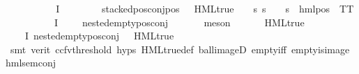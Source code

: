 \begin{isabellebody}
\ \ \isamarkupfalse%
\ {}\ \isamarkupfalse%
\ {\isasymphi}\ \ {\isachardoublequoteopen}{\isasymphi}{\isasymin}{\isasymPhi}\ {\isacharbackquote}{\kern0pt}\ I{\isachardoublequoteclose}\isanewline
\ \ \ \ \ \ \ \ {\isachardoublequoteopen}stacked{\isacharunderscore}{\kern0pt}pos{\isacharunderscore}{\kern0pt}conj{\isacharunderscore}{\kern0pt}pos\ {\isasymphi}{\isachardoublequoteclose}\ {\isachardoublequoteopen}{\isacharparenleft}{\kern0pt}{\isasymnot}\ HML{\isacharunderscore}{\kern0pt}true\ {\isasymphi}\ {\isasymlongrightarrow}\ {\isacharparenleft}{\kern0pt}{\isasymexists}{\isasymalpha}{\isachardot}{\kern0pt}\ {\isasymforall}s{\isachardot}{\kern0pt}\ {\isacharparenleft}{\kern0pt}s\ {\isasymTurnstile}\ {\isasymphi}{\isacharparenright}{\kern0pt}\ {\isacharequal}{\kern0pt}\ {\isacharparenleft}{\kern0pt}s\ {\isasymTurnstile}\ hml{\isacharunderscore}{\kern0pt}pos\ {\isasymalpha}\ TT{\isacharparenright}{\kern0pt}{\isacharparenright}{\kern0pt}{\isacharparenright}{\kern0pt}{\isachardoublequoteclose}\isanewline
\ \ \ \ \ \ \ \ {\isachardoublequoteopen}{\isacharparenleft}{\kern0pt}{\isasymforall}{\isasympsi}{\isasymin}{\isasymPhi}\ {\isacharbackquote}{\kern0pt}\ I{\isachardot}{\kern0pt}\ {\isasympsi}\ {\isasymnoteq}\ {\isasymphi}\ {\isasymlongrightarrow}\ nested{\isacharunderscore}{\kern0pt}empty{\isacharunderscore}{\kern0pt}pos{\isacharunderscore}{\kern0pt}conj\ {\isasympsi}{\isacharparenright}{\kern0pt}{\isachardoublequoteclose}\isanewline
\ \ \ \ \isamarkupfalse%
\ meson\isanewline
\ \ \isamarkupfalse%
\ \isamarkupfalse%
\ {\isachardoublequoteopen}{\isasymnot}\ HML{\isacharunderscore}{\kern0pt}true\ {\isasymphi}{\isachardoublequoteclose}\ \isamarkupfalse%
\ {}{\isacharparenleft}{\kern0pt}{}{\isacharparenright}{\kern0pt}\ {\isacartoucheopen}{\isacharparenleft}{\kern0pt}{\isasymforall}{\isasympsi}{\isasymin}{\isasymPhi}\ {\isacharbackquote}{\kern0pt}\ I{\isachardot}{\kern0pt}\ nested{\isacharunderscore}{\kern0pt}empty{\isacharunderscore}{\kern0pt}pos{\isacharunderscore}{\kern0pt}conj\ {\isasympsi}\ {\isasymlongrightarrow}\ HML{\isacharunderscore}{\kern0pt}true\ {\isasympsi}{\isacharparenright}{\kern0pt}{\isacartoucheclose}\isanewline
\ \ \ \ \isamarkupfalse%
\ {\isacharparenleft}{\kern0pt}smt\ {\isacharparenleft}{\kern0pt}verit{\isacharcomma}{\kern0pt}\ ccfv{\isacharunderscore}{\kern0pt}threshold{\isacharparenright}{\kern0pt}\ {\isachardoublequoteopen}{}{\isachardot}{\kern0pt}hyps{\isachardoublequoteclose}\ HML{\isacharunderscore}{\kern0pt}true{\isacharunderscore}{\kern0pt}def\ ball{\isacharunderscore}{\kern0pt}imageD\ empty{\isacharunderscore}{\kern0pt}iff\ empty{\isacharunderscore}{\kern0pt}is{\isacharunderscore}{\kern0pt}image\ hml{\isacharunderscore}{\kern0pt}sem{\isacharunderscore}{\kern0pt}conj{\isacharparenright}{\kern0pt}\isanewline

\end{isabellebody}
